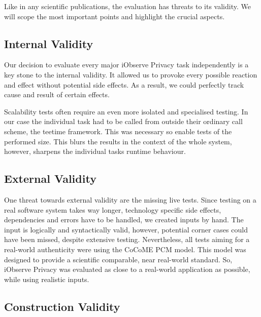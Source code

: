 Like in any scientific publications, the evaluation has threats to its validity. We will scope the most important points and highlight the crucial aspects.   

\subsection{Internal Validity} %

Our decision to evaluate every major iObserve Privacy task independently is a key stone to the internal validity. It allowed us to provoke every possible reaction and effect without potential side effects. As a result, we could perfectly track cause and result of certain effects.

Scalability tests often require an even more isolated and specialised testing. In our case the individual task had to be called from outside their ordinary call scheme, the teetime framework. This was necessary so enable tests of the performed size. This blurs the results in the context of the whole system, however, sharpens the individual tasks runtime behaviour.  

\subsection{External Validity} %

One threat towards external validity are the missing live tests. Since testing on a real software system takes way longer, technology specific side effects, dependencies and errors have to be handled, we created inputs by hand. The input is logically and syntactically valid, however, potential corner cases could have been missed, despite extensive testing.  Nevertheless, all tests aiming for a real-world authenticity were using the CoCoME PCM model. This model was designed to provide a scientific comparable, near real-world standard. So, iObserve Privacy was evaluated as close to a real-world application as possible, while using realistic inputs.



\subsection{Construction Validity}

